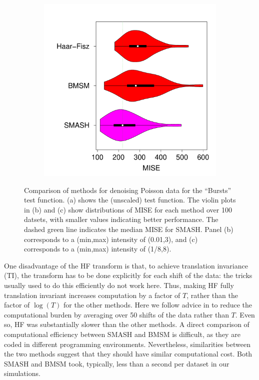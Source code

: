 \documentclass[12pt]{article}
\begin{document}
\begin{figure}
\begin{subfigure}[b]{0.45\textwidth}
        \caption{}
        \label{fig:pois_1}
    \end{subfigure}
		\hfill
    \begin{subfigure}[b]{0.45\textwidth}
        \centering
        \includegraphics[width=\textwidth]{violin_pois_8.pdf}
        \caption{}
        \label{fig:pois_8}
    \end{subfigure}
    \caption{Comparison of methods for denoising Poisson data for the ``Bursts'' test function. (a) shows the (unscaled) test function. The violin plots in (b) and (c) show distributions of MISE for each method over 100 datsets, with smaller values indicating better performance. The dashed green line indicates the median MISE for SMASH. Panel (b) corresponds to a (min,max) intensity of (0.01,3), and (c) corresponds to a (min,max) intensity of (1/8,8).}
    \label{fig:pois_sim}
\end{figure}

One disadvantage of the HF transform is that, to achieve translation invariance (TI), the transform has to be done explicitly for each shift of the data: the tricks usually used to do this efficiently \cite{Coifman1995Translationinvariant} do not work here. Thus, making HF fully translation invariant increases computation by a factor of $T$, rather than the factor of $\log(T)$ for the other methods. Here we follow advice in \cite{Fryzlewicz2004HaarFisz} to reduce the computational burden by averaging over 50 shifts of the data rather than $T$. Even so, HF was substantially slower than the other methods.
 A direct comparison of computational efficiency between SMASH and BMSM is difficult, as they are coded in different programming environments. Nevertheless, similarities between the two methods suggest that they should have similar computational cost.
 Both SMASH and BMSM took, typically, less than a second per dataset in our simulations.
\end{document}
